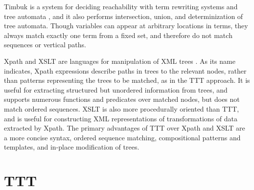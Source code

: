 \documentclass[a4,11pt]{article}
\begin{document}
Timbuk is a system for deciding reachability with term rewriting systems and tree automata \cite{Genet:2003}, and it also performs intersection, union, and determinization of tree automata. Though variables can appear at arbitrary locations in terms, they always match exactly one term from a fixed set, and therefore do not match sequences or vertical paths. 

Xpath and XSLT are languages for manipulation of XML trees \cite{w3-xpath,w3-xslt}.
As its name indicates, Xpath expressions describe paths in trees to the relevant nodes, rather than patterns representing the trees to be matched, as in the TTT approach.
It is useful for extracting structured but unordered information from trees, and 
supports numerous functions and predicates over matched nodes, but does not match ordered sequences. XSLT is also more procedurally oriented than TTT, and is useful for constructing XML representations of transformations of data extracted by Xpath. The primary advantages of TTT over Xpath and XSLT are a more concise syntax, ordered sequence matching, compositional patterns and templates, and in-place modification of trees.




\section{TTT}
\end{document}
